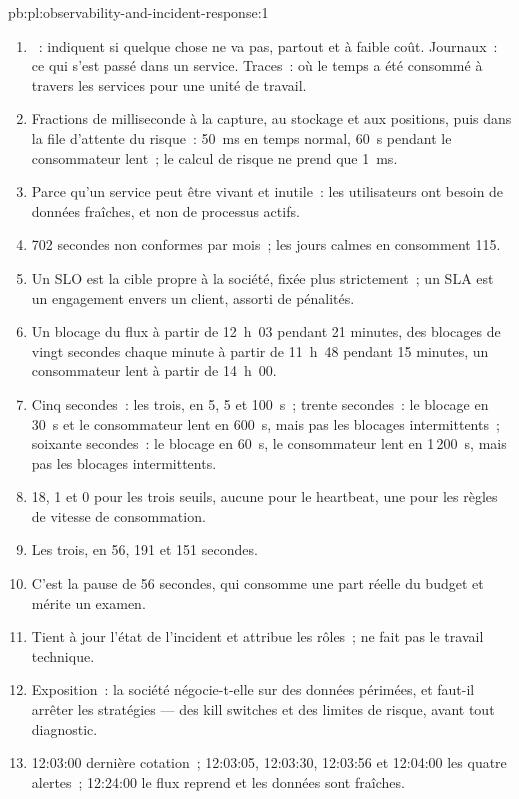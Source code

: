 \begin{solution}{pb:pl:observability-and-incident-response:1}
\begin{enumerate}
\item {}~: indiquent si quelque chose ne va pas, partout et à faible coût. Journaux~: ce qui s'est passé dans un service. Traces~: où le temps a été consommé à travers les services pour une
unité de travail.
\item Fractions de milliseconde à la capture, au stockage et aux positions, puis dans la file d'attente du risque~: 50~ms en temps normal, 60~s pendant le consommateur lent~; le calcul de
risque ne prend que 1~ms.
\item Parce qu'un service peut être vivant et inutile~: les utilisateurs ont besoin de données fraîches, et non de processus actifs.
\item 702 secondes non conformes par mois~; les jours calmes en consomment 115.
\item Un SLO est la cible propre à la société, fixée plus strictement~; un SLA est un engagement envers un client, assorti de pénalités.
\item Un blocage du flux à partir de 12~h~03 pendant 21 minutes, des blocages de vingt secondes chaque minute à partir de 11~h~48 pendant 15 minutes, un consommateur lent à partir de 14~h~00.
\item Cinq secondes~: les trois, en 5, 5 et 100~s~; trente secondes~: le blocage en 30~s et le consommateur lent en 600~s, mais pas les blocages intermittents~;
soixante secondes~: le blocage en 60~s, le consommateur lent en 1\,200~s, mais pas les blocages intermittents.
\item 18, 1 et 0 pour les trois seuils, aucune pour le heartbeat, une pour les règles de vitesse de consommation.
\item Les trois, en 56, 191 et 151 secondes.
\item C'est la pause de 56 secondes, qui consomme une part réelle du budget et mérite un examen.
\item Tient à jour l'état de l'incident et attribue les rôles~; ne fait pas le travail technique.
\item Exposition~: la société négocie-t-elle sur des données périmées, et faut-il arrêter les stratégies --- des kill switches et des limites de risque, avant tout diagnostic.
\item 12:03:00 dernière cotation~; 12:03:05, 12:03:30, 12:03:56 et 12:04:00 les quatre alertes~; 12:24:00 le flux reprend et les données sont fraîches.

\end{enumerate}
\end{solution}
